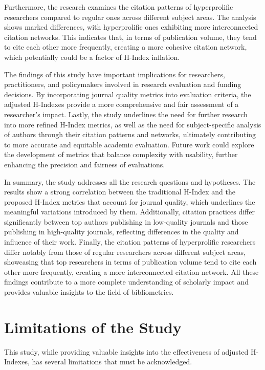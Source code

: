 Furthermore, the research examines the citation patterns of hyperprolific
researchers compared to regular ones across different subject areas. The
analysis shows marked differences, with hyperprolific ones exhibiting more
interconnected citation networks. This indicates that, in terms of publication
volume, they tend to cite each other more frequently, creating a more cohesive
citation network, which potentially could be a factor of H-Index inflation.

The findings of this study have important implications for researchers,
practitioners, and policymakers involved in research evaluation and funding
decisions. By incorporating journal quality metrics into evaluation criteria,
the adjusted H-Indexes provide a more comprehensive and fair assessment of a
researcher’s impact. Lastly, the study underlines the need for further research
into more refined H-Index metrics, as well as the need for subject-specific
analysis of authors through their citation patterns and networks, ultimately
contributing to more accurate and equitable academic evaluation. Future work
could explore the development of metrics that balance complexity with
usability, further enhancing the precision and fairness of evaluations.

In summary, the study addresses all the research questions and hypotheses. The
results show a strong correlation between the traditional H-Index and the
proposed H-Index metrics that account for journal quality, which underlines the
meaningful variations introduced by them. Additionally, citation practices
differ significantly between top authors publishing in low-quality journals and
those publishing in high-quality journals, reflecting differences in the
quality and influence of their work. Finally, the citation patterns of
hyperprolific researchers differ notably from those of regular researchers
across different subject areas, showcasing that top researchers in terms of
publication volume tend to cite each other more frequently, creating a more
interconnected citation network. All these findings contribute to a more
complete understanding of scholarly impact and provides valuable insights to
the field of bibliometrics.

\section{Limitations of the Study}

This study, while providing valuable insights into the effectiveness of
adjusted H-Indexes, has several limitations that must be acknowledged.

